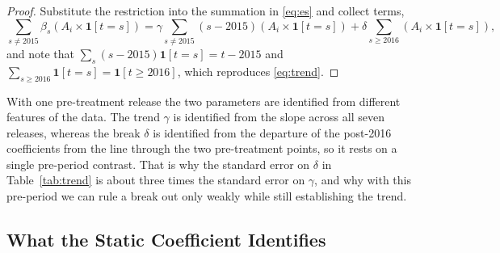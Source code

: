 \documentclass[12pt,leqno]{article}
\begin{document}
\begin{proof}
Substitute the restriction into the summation in \eqref{eq:es} and collect terms,
\begin{equation}
\sum_{s \neq 2015} \beta_s \left(A_i \times \mathbf{1}[t=s]\right)
= \gamma \sum_{s \neq 2015} (s-2015) \left(A_i \times \mathbf{1}[t=s]\right) + \delta \sum_{s \geq 2016} \left(A_i \times \mathbf{1}[t=s]\right),
\end{equation}
and note that $\sum_{s}(s-2015)\mathbf{1}[t=s] = t - 2015$ and $\sum_{s \geq 2016}\mathbf{1}[t=s] = \mathbf{1}[t \geq 2016]$, which reproduces \eqref{eq:trend}.
\end{proof}

With one pre-treatment release the two parameters are identified from different features of the data. The trend $\gamma$ is identified from the slope across all seven releases, whereas the break $\delta$ is identified from the departure of the post-2016 coefficients from the line through the two pre-treatment points, so it rests on a single pre-period contrast. That is why the standard error on $\delta$ in Table~\ref{tab:trend} is about three times the standard error on $\gamma$, and why with this pre-period we can rule a break out only weakly while still establishing the trend.

\subsection{What the Static Coefficient Identifies}
\end{document}
